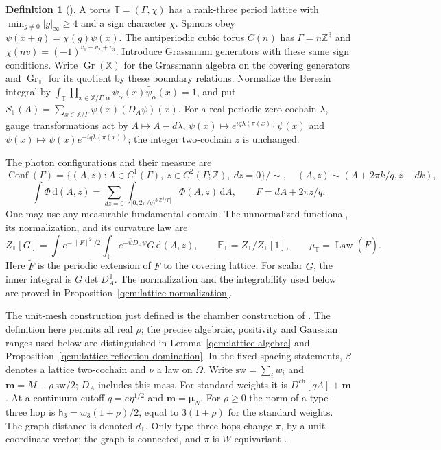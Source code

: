 \documentclass[11pt,letterpaper,reqno]{amsart}
\theoremstyle{definition}
\newtheorem{qcmdefinition}[qcmproposition]{Definition}
\newenvironment{definition}[1][]{\pushQED{\qed}\renewcommand{\qedsymbol}{$\blacksquare$}\begin{qcmdefinition}[#1]}{\popQED\end{qcmdefinition}}
\begin{document}
\begin{definition}
A torus $\mathbb T=(\Gamma,\chi)$ has a rank-three period lattice
with $\min_{g\ne0}|g|_\infty\ge4$ and a sign character $\chi$.
Spinors obey $\psi(x+g)=\chi(g)\psi(x)$. The antiperiodic cubic
torus $C(n)$ has $\Gamma=n\mathbb Z^3$ and
$\chi(nv)=(-1)^{v_1+v_2+v_3}$. Introduce Grassmann generators with
these same sign conditions. Write $\operatorname{Gr}(\mathbb X)$
for the Grassmann algebra on the covering generators and
$\operatorname{Gr}_{\mathbb T}$ for its quotient by these boundary
relations. Normalize the Berezin integral by
$\int_{\mathbb T}\prod_{x\in\mathbb X/\Gamma,\alpha}
\psi_\alpha(x)\bar\psi_\alpha(x)=1$, and put
$S_{\mathbb T}(A)=\sum_{x\in\mathbb X/\Gamma}
\bar\psi(x)(D_A\psi)(x)$.
For a real periodic zero-cochain $\lambda$, gauge transformations act by $A\mapsto A-d\lambda$,
$\psi(x)\mapsto e^{iq\lambda(\pi(x))}\psi(x)$ and
$\bar\psi(x)\mapsto\bar\psi(x)e^{-iq\lambda(\pi(x))}$;
the integer two-cochain $z$ is unchanged.

The photon configurations and their measure are
\[
 \operatorname{Conf}(\Gamma)
 =\{(A,z):A\in C^1(\Gamma),\ z\in C^2(\Gamma;\mathbb Z),\ dz=0\}/\!\sim,
 \quad (A,z)\sim(A+2\pi k/q,z-dk),
\]
\[
 \int\Phi\,\mathrm d(A,z)=
 \sum_{dz=0}\int_{[0,2\pi/q)^{3|\mathbb Z^3/\Gamma|}}
                         \Phi(A,z)\,\mathrm dA,
 \qquad F=dA+2\pi z/q.
\]
One may use any measurable fundamental domain. The unnormalized
functional, its normalization, and its curvature law are
\[
 Z_{\mathbb T}[G]=\int e^{-\|F\|^2/2}
                 \int_{\mathbb T}e^{-\bar\psi D_A\psi}G\,\mathrm d(A,z),
 \qquad \mathbb E_{\mathbb T}=Z_{\mathbb T}/Z_{\mathbb T}[1],
 \qquad \mu_{\mathbb T}=\operatorname{Law}(\widetilde F).
\]
Here $\widetilde F$ is the periodic extension of $F$ to the covering lattice.
For scalar $G$, the inner integral is $G\det D_A^{\mathbb T}$.
The normalization and the integrability used below are proved in
Proposition~\ref{qcm:lattice-normalization}.
\end{definition}

The unit-mesh construction just defined is the chamber construction
of \cite[Section~2]{QEDConstruction}. The definition here permits all
real $\rho$; the precise algebraic, positivity and Gaussian ranges
used below are distinguished in Lemma~\ref{qcm:lattice-algebra} and
Proposition~\ref{qcm:lattice-reflection-domination}.
In the fixed-spacing statements, $\beta$ denotes a lattice
two-cochain and $\nu$ a law on $\Omega$. Write
$\mathrm{sw}=\sum_iw_i$ and
$\mathbf m=M-\rho\,\mathrm{sw}/2$; $D_A$ includes this mass.
For standard weights it is $D^{\mathrm{ch}}[qA]+\mathbf m$.
At a continuum cutoff $q=e\eta^{1/2}$ and
$\mathbf m=\boldsymbol\mu_N$. For $\rho\ge0$ the norm of a type-three
hop is $\mathsf h_3=w_3(1+\rho)/2$, equal to $3(1+\rho)$ for the
standard weights. The graph distance is denoted $d_{\mathbb T}$.
Only type-three hops change $\pi$, by a unit coordinate vector;
the graph is connected, and $\pi$ is $W$-equivariant
\cite[Proposition~2.1]{QEDConstruction}.
\end{document}
